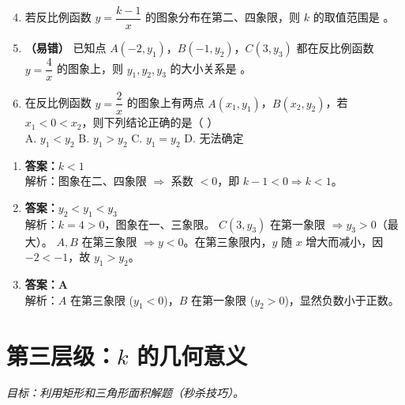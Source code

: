 \documentclass[12pt, a4paper]{article}
\begin{document}
\begin{examplebox}
    \begin{enumerate}[label=\textbf{例\arabic*.}]
        \setcounter{enumi}{3}
        \item 若反比例函数 $y = \dfrac{k-1}{x}$ 的图象分布在第二、四象限，则 $k$ 的取值范围是 \underline{\hspace{2cm}}。
        
        \item \textbf{（易错）} 已知点 $A(-2, y_1)$，$B(-1, y_2)$，$C(3, y_3)$ 都在反比例函数 $y = \dfrac{4}{x}$ 的图象上，则 $y_1, y_2, y_3$ 的大小关系是 \underline{\hspace{2cm}}。
        
        \item 在反比例函数 $y = \dfrac{2}{x}$ 的图象上有两点 $A(x_1, y_1)$，$B(x_2, y_2)$，若 $x_1 < 0 < x_2$，则下列结论正确的是（ \quad ）\\
        A. $y_1 < y_2$ \quad B. $y_1 > y_2$ \quad C. $y_1 = y_2$ \quad D. 无法确定
    \end{enumerate}
\end{examplebox}

\begin{answerbox}
    \begin{enumerate}
        \item \textbf{答案：$k < 1$} \\
        解析：图象在二、四象限 $\Rightarrow$ 系数 $< 0$，即 $k-1 < 0 \Rightarrow k < 1$。
        
        \item \textbf{答案：$y_2 < y_1 < y_3$} \\
        解析：$k=4>0$，图象在一、三象限。
        $C(3, y_3)$ 在第一象限 $\Rightarrow y_3 > 0$（最大）。
        $A, B$ 在第三象限 $\Rightarrow y < 0$。在第三象限内，$y$ 随 $x$ 增大而减小，因 $-2 < -1$，故 $y_1 > y_2$。
        
        \item \textbf{答案：A} \\
        解析：$A$ 在第三象限 ($y_1 < 0$)，$B$ 在第一象限 ($y_2 > 0$)，显然负数小于正数。
    \end{enumerate}
\end{answerbox}

\section{第三层级：$k$ 的几何意义}
\textit{目标：利用矩形和三角形面积解题（秒杀技巧）。}
\end{document}
